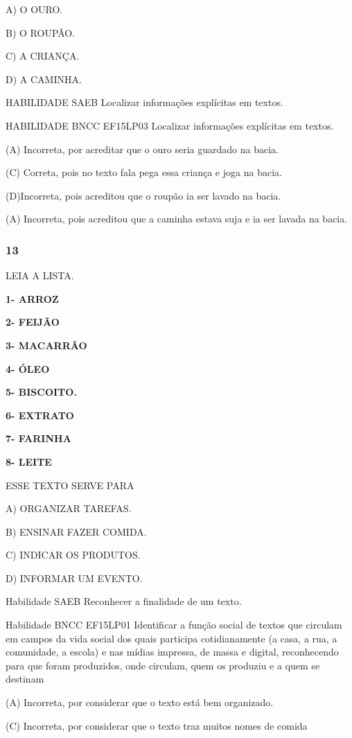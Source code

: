 \begin{escola}
A) O OURO.

B) O ROUPÃO.

C) A CRIANÇA.

D) A CAMINHA.

HABILIDADE SAEB Localizar informações explícitas em textos.

HABILIDADE BNCC EF15LP03 Localizar informações explícitas em textos.

(A) Incorreta, por acreditar que o ouro seria guardado na bacia.

(C) Correta, pois no texto fala pega essa criança e joga na bacia.

(D)Incorreta, pois acreditou que o roupão ia ser lavado na bacia.

(A) Incorreta, pois acreditou que a caminha estava suja e ia ser lavada
na bacia.

\subsubsection{13 }\label{section-69}

LEIA A LISTA.

\textbf{1- ARROZ}

\textbf{2- FEIJÃO}

\textbf{3- MACARRÃO}

\textbf{4- ÓLEO}

\textbf{5- BISCOITO.}

\textbf{6- EXTRATO}

\textbf{7- FARINHA}

\textbf{8- LEITE}

ESSE TEXTO SERVE PARA

A) ORGANIZAR TAREFAS.

B) ENSINAR FAZER COMIDA.

C) INDICAR OS PRODUTOS.

D) INFORMAR UM EVENTO.

Habilidade SAEB Reconhecer a finalidade de um texto.

Habilidade BNCC EF15LP01 Identificar a função social de textos que
circulam em campos da vida social dos quais participa cotidianamente (a
casa, a rua, a comunidade, a escola) e nas mídias impressa, de massa e
digital, reconhecendo para que foram produzidos, onde circulam, quem os
produziu e a quem se destinam

(A) Incorreta, por considerar que o texto está bem organizado.

(C) Incorreta, por considerar que o texto traz muitos nomes de comida


\end{escola}
